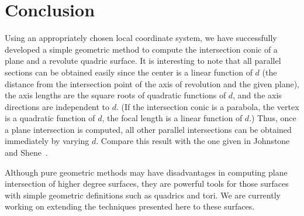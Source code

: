 
\section{Conclusion}
\label{section:conclusion}

     Using an appropriately chosen local coordinate system, we have
successfully developed a simple geometric method to compute the intersection
conic of a plane and a revolute quadric surface.  It is interesting to note
that all parallel sections can be obtained easily since the center is a linear
function of $d$ (the distance from the intersection point of the axis of
revolution and the given plane), the axis lengths are the square roots of
quadratic functions of $d$, and the axis directions are independent to $d$.
(If the intersection conic is a parabola, the vertex is a quadratic function
of $d$, the focal length is a linear function of $d$.)  Thus, once a plane
intersection is computed, all other parallel intersections can be obtained
immediately by varying $d$.  Compare this result with the one given in
Johnstone and Shene~\cite{johnstone-shene:1991}.

     Although pure geometric methods may have disadvantages in computing
plane intersection of higher degree surfaces, they are powerful tools for those
surfaces with simple geometric definitions such as quadrics and tori.
We are currently working on extending the techniques presented here to these
surfaces.


